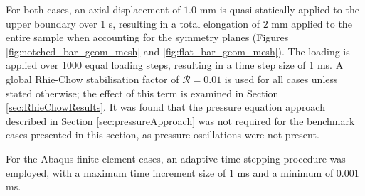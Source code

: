 \documentclass[sn-mathphys,Numbered]{sn-jnl}%
\begin{document}
For both cases, an axial displacement of $1.0$ mm is quasi-statically applied to the upper boundary over 1 s, resulting in a total elongation of $2$ mm applied to the entire sample when accounting for the symmetry planes (Figures \ref{fig:notched_bar_geom_mesh} and \ref{fig:flat_bar_geom_mesh}).
The loading is applied over 1000 equal loading steps, resulting in a time step size of 1 ms.
A global Rhie-Chow stabilisation factor of $\mathcal{R} = 0.01$ is used for all cases unless stated otherwise; the effect of this term is examined in Section \ref{sec:RhieChowResults}.
It was found that the pressure equation approach described in Section \ref{sec:pressureApproach} was not required for the benchmark cases presented in this section, as pressure oscillations were not present.



For the Abaqus finite element cases, an adaptive time-stepping procedure was employed, with a maximum time increment size of $1$ ms and a minimum of $0.001$ ms.

\end{document}
